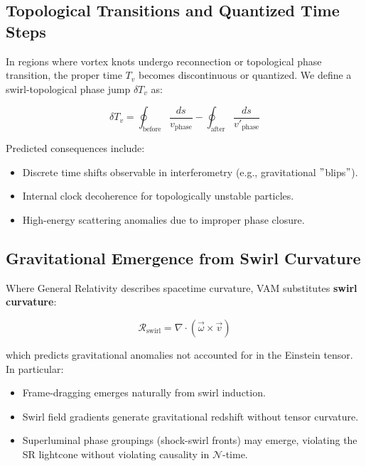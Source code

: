 \documentclass[12pt]{article}
\begin{document}
    \subsection*{Topological Transitions and Quantized Time Steps}

    In regions where vortex knots undergo reconnection or topological phase transition, the proper time \( T_v \) becomes discontinuous or quantized. We define a swirl-topological phase jump \( \delta T_v \) as:\\

    \begin{eqbox}
        \begin{equation}
            \delta T_v = \oint_{\text{before}} \frac{ds}{v_\text{phase}} - \oint_{\text{after}} \frac{ds}{v'_\text{phase}}
        \end{equation}
    \end{eqbox}


    Predicted consequences include:
    \begin{itemize}
        \item Discrete time shifts observable in interferometry (e.g., gravitational \("\)blips\("\)).
        \item Internal clock decoherence for topologically unstable particles.
        \item High-energy scattering anomalies due to improper phase closure.
    \end{itemize}

    \subsection*{Gravitational Emergence from Swirl Curvature}

    Where General Relativity describes spacetime curvature, VAM substitutes \textbf{swirl curvature}:
    \begin{eqbox}
        \begin{equation}
            \mathcal{R}_{\text{swirl}} = \nabla \cdot (\vec{\omega} \times \vec{v})
        \end{equation}
    \end{eqbox}

    which predicts gravitational anomalies not accounted for in the Einstein tensor. In particular:
    \begin{itemize}
        \item Frame-dragging emerges naturally from swirl induction.
        \item Swirl field gradients generate gravitational redshift without tensor curvature.
        \item Superluminal phase groupings (shock-swirl fronts) may emerge, violating the SR lightcone without violating causality in \( \mathcal{N} \)-time.
    \end{itemize}
\end{document}
